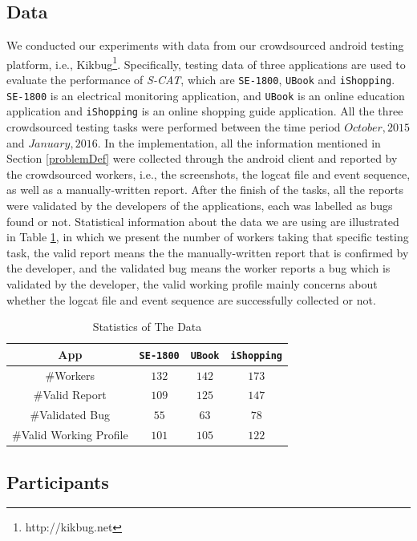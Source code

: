 \documentclass[10pt,conference]{IEEEtran}
\begin{document}
\subsection{Data}
We conducted our experiments with data from our crowdsourced android testing platform, i.e., Kikbug\footnote{http://kikbug.net}.
Specifically, testing data of three applications are used to evaluate the performance of \emph{S-CAT}, which are \texttt{SE-1800}, \texttt{UBook} and \texttt{iShopping}.
\texttt{SE-1800} is an electrical monitoring application, and \texttt{UBook} is an online education application and \texttt{iShopping} is an online shopping guide application.
All the three crowdsourced testing tasks were performed between the time period $October, 2015$ and $January, 2016$. In the implementation,
all the information mentioned in Section \ref{problemDef} were collected through the android client and reported by the crowdsourced workers, i.e., the screenshots,
the logcat file and event sequence, as well as a manually-written report. After the finish of the tasks, all the reports were validated by the
developers of the applications, each was labelled as bugs found or not. Statistical information about the data we are using are illustrated
in Table \ref{tab:stats}, in which we present the number of workers taking that specific testing task, the valid report means the the manually-written
report that is confirmed by the developer, and the validated bug means the worker reports a bug which is validated by the developer,
the valid working profile mainly concerns about whether the logcat file and event sequence are successfully collected or not.

\begin{table}[h]
\centering
\small
\caption{Statistics of The Data}
\begin{tabular}{cccc}
\hline
App & \texttt{SE-1800} & \texttt{UBook} & \texttt{iShopping} \\ \hline
\#Workers & $132$ & $142$ & $173$ \\ \hline
\#Valid Report & $109$ & $125$ & $147$ \\ \hline
\#Validated Bug & $55$ & $63$ & $78$ \\ \hline
\#Valid Working Profile & $101$ & $105$ & $122$ \\ \hline
\end{tabular}
\label{tab:stats}
\end{table}


\subsection{Participants}
\end{document}
